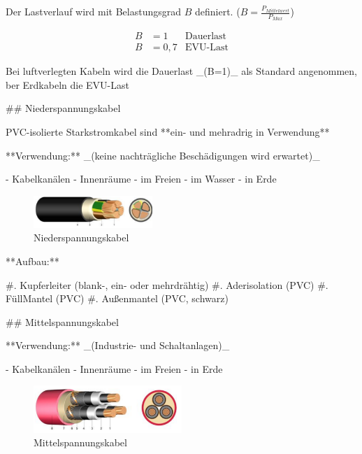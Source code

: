 Der Lastverlauf wird mit Belastungsgrad $B$ definiert. ($B = \frac{P_{Mittelwert}}{P_{Max}}$)

\begin{align*}
    B &= 1   & \text{Dauerlast}\\
    B &= 0,7 & \text{EVU-Last} 
\end{align*}

\begin{markdown}

Bei luftverlegten Kabeln wird die Dauerlast _(B=1)_ als Standard angenommen, ber Erdkabeln die EVU-Last 

\newpage

## Niederspannungskabel

PVC-isolierte Starkstromkabel sind **ein- und mehradrig in Verwendung**

**Verwendung:** _(keine nachträgliche Beschädigungen wird erwartet)_

- Kabelkanälen
- Innenräume
- im Freien
- im Wasser
- in Erde

\begin{figure}
    \centering
    \includegraphics[width=0.4\textwidth]{./images/09-Kabel/Niederspannungskabel.png}
    \caption[Niederspannungskabel]{Niederspannungskabel}
\end{figure}

**Aufbau:**

#. Kupferleiter (blank-, ein- oder mehrdrähtig)
#. Aderisolation (PVC)
#. FüllMantel (PVC)
#. Außenmantel (PVC, schwarz)

## Mittelspannungskabel

**Verwendung:** _(Industrie- und Schaltanlagen)_

- Kabelkanälen
- Innenräume
- im Freien
- in Erde

\begin{figure}
    \centering
    \includegraphics[width=0.5\textwidth]{./images/09-Kabel/Mittelspannungskabel.png}
    \caption[Mittelspannungskabel]{Mittelspannungskabel}
\end{figure}


\end{markdown}
